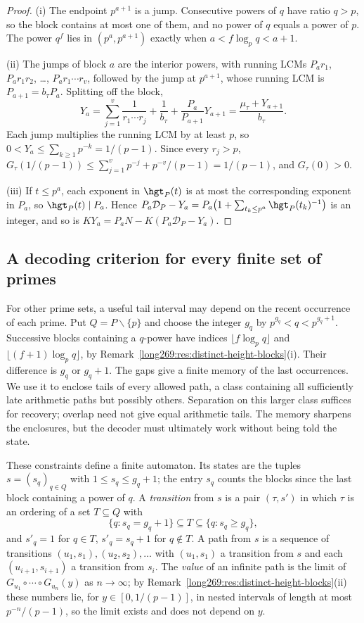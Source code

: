 \begin{proof}
(i) The endpoint $p^{a+1}$ is a jump.  Consecutive powers of $q$ have ratio
$q>p$, so the block contains at most one of them, and no power of $q$ equals
a power of $p$.  The power $q^f$ lies in $(p^a,p^{a+1})$ exactly when
$a<f\log_pq<a+1$.

(ii) The jumps of block $a$ are the interior powers, with running LCMs
$P_ar_1$, $P_ar_1r_2$, \ldots, $P_ar_1\cdots r_v$, followed by the jump at
$p^{a+1}$, whose running LCM is $P_{a+1}=b_\tau P_a$.  Splitting off the block,
\[
 Y_a=\sum_{j=1}^{v}\frac1{r_1\cdots r_j}+\frac1{b_\tau}
    +\frac{P_a}{P_{a+1}}Y_{a+1}=\frac{\mu_\tau+Y_{a+1}}{b_\tau}.
\]
Each jump multiplies the running LCM by at least $p$, so
$0<Y_a\le\sum_{k\ge1}p^{-k}=1/(p-1)$.  Since every $r_j>p$,
$G_\tau(1/(p-1))\le\sum_{j=1}^{v}p^{-j}+p^{-v}/(p-1)=1/(p-1)$, and
$G_\tau(0)>0$.

(iii) If $t\le p^a$, each exponent in $\hgt_P(t)$ is at most the
corresponding exponent in $P_a$, so $\hgt_P(t)\mid P_a$.  Hence
$P_a\mathcal D_P-Y_a=P_a\bigl(1+\sum_{t_k\le p^a}\hgt_P(t_k)^{-1}\bigr)$ is
an integer, and so is $KY_a=P_aN-K(P_a\mathcal D_P-Y_a)$.
\end{proof}

\subsection{A decoding criterion for every finite set of primes}
\label{long269:sec:distinct-criterion}
For other prime sets, a useful tail interval may depend on the recent
occurrence of each prime. Put $Q=P\smallsetminus\{p\}$ and choose the
integer $g_q$ by $p^{g_q}<q<p^{g_q+1}$. Successive blocks containing a
$q$-power have indices $\lfloor f\log_p q\rfloor$ and
$\lfloor(f+1)\log_p q\rfloor$, by
Remark~\ref{long269:res:distinct-height-blocks}(i). Their difference is
$g_q$ or $g_q+1$. The gaps give a finite memory of the last occurrences. We use it to
enclose tails of every allowed path, a class containing all sufficiently
late arithmetic paths but possibly others. Separation on this larger
class suffices for recovery; overlap need not give equal arithmetic tails.
The memory sharpens the enclosures, but the decoder must ultimately work
without being told the state.

These constraints define a finite automaton.  Its states are the tuples
$s=(s_q)_{q\in Q}$ with $1\le s_q\le g_q+1$; the entry $s_q$ counts the blocks
since the last block containing a power of $q$.  A \emph{transition} from $s$
is a pair $(\tau,s')$ in which $\tau$ is an ordering of a set $T\subseteq Q$
with
\[
 \{q:s_q=g_q+1\}\subseteq T\subseteq\{q:s_q\ge g_q\},
\]
and $s'_q=1$ for $q\in T$, $s'_q=s_q+1$ for $q\notin T$.  A path from $s$
is a sequence of transitions $(u_1,s_1),(u_2,s_2),\ldots$ with $(u_1,s_1)$ a
transition from $s$ and each $(u_{i+1},s_{i+1})$ a transition from $s_i$.
The \emph{value} of an infinite path is the limit of
$G_{u_1}\circ\cdots\circ G_{u_n}(y)$ as $n\to\infty$; by
Remark~\ref{long269:res:distinct-height-blocks}(ii) these numbers lie, for
$y\in[0,1/(p-1)]$, in nested intervals of length at most $p^{-n}/(p-1)$, so
the limit exists and does not depend on $y$.

